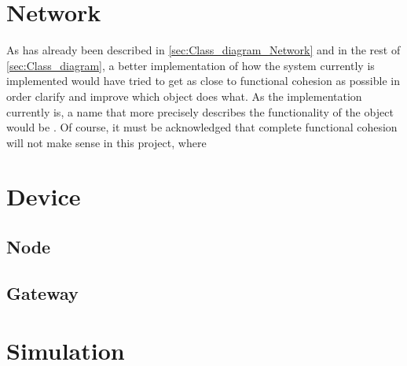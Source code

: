 \section{Network}
As has already been described in \autoref{sec:Class_diagram_Network} and in the rest of \autoref{sec:Class_diagram}, a better implementation of how the system currently is implemented would have tried to get as close to functional cohesion as possible in order clarify and improve which object does what. As the implementation currently is, a name that more precisely describes the functionality of the  object would be . Of course, it must be acknowledged that complete functional cohesion will not make sense in this project, where


\section{Device}


\subsection{Node}


\subsection{Gateway}


\section{Simulation}




































